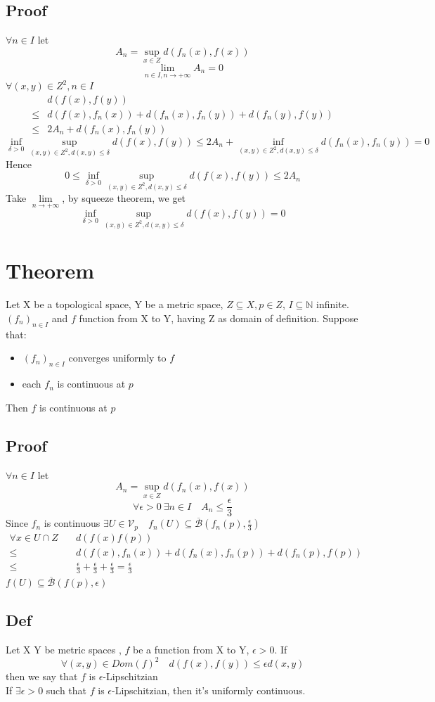 \documentclass{book}
\begin{document}
\subsection{Proof}
$\forall n\in I$ let $$A_n=\sup\limits_{x\in Z}d(f_n(x),f(x))$$
$$ \lim\limits_{n\in I,n\rightarrow+\infty}A_n=0$$
$\forall (x,y)\in Z^2,n\in I$
$$\begin{aligned}
&d(f(x),f(y))\\\leq &d(f(x),f_n(x))+d(f_n(x),f_n(y))+d(f_n(y),f(y))\\\leq &2A_n+d(f_n(x),f_n(y))
\end{aligned}$$
$$\inf\limits_{\delta>0}\sup\limits_{(x,y)\in Z^2,d(x,y)\leq\delta} d(f(x),f(y))\leq 2A_n+\inf\limits_{(x,y)\in Z^2,d(x,y)\leq\delta}d(f_n(x),f_n(y))=0$$ 
Hence $$0\leq \inf\limits_{\delta>0}\sup\limits_{(x,y)\in Z^2,d(x,y)\leq\delta}d(f(x),f(y))\leq 2A_n$$
Take $\lim\limits_{n\rightarrow+\infty}$, by squeeze theorem, we get$$\inf\limits_{\delta>0}\sup\limits_{(x,y)\in Z^2,d(x,y)\leq\delta}d(f(x),f(y))=0$$
\section{Theorem}
Let X be a topological space, Y be a metric space, $Z\subseteq X, p\in Z$, $I\subseteq \mathbb{N} $ infinite. $(f_n)_{n\in I}$ and $f$ function from X to Y, having Z as domain of definition. Suppose that:
\begin{itemize}
    \item $(f_n)_{n\in I}$ converges uniformly to $f$
    \item each $f_n$ is continuous at $p$
\end{itemize}
Then $f$ is continuous at $p$
\subsection{Proof}
$\forall n\in I$ let $$A_n=\sup\limits_{x\in Z}d(f_n(x),f(x))$$
$$\forall \epsilon>0\ \exists n\in I\quad A_n\leq\frac{\epsilon}{3}$$
Since $f_n$ is continuous $\exists U\in \mathcal{V}_p\quad f_n(U)\subseteq \overline{\mathcal{B}}(f_n(p),\frac{\epsilon}{3})$
$$\begin{aligned}
\forall x\in U\cap Z\quad  &d(f(x)f(p))\\\leq &d(f(x),f_n(x))+d(f_n(x),f_n(p))+d(f_n(p),f(p))\\\leq &\frac{\epsilon}{3}+\frac{\epsilon}{3}+\frac{\epsilon}{3}=\frac{\epsilon}{3}
\end{aligned}$$
$f(U)\subseteq\overline{\mathcal{B}}(f(p),\epsilon)$
\subsection{Def}
Let X Y be metric spaces , $f$ be a function from X to Y, $\epsilon>0$. If $$\forall (x,y)\in Dom(f)^2\quad d(f(x),f(y))\leq\epsilon d(x,y)$$
then we say that $f$ is $\epsilon$-Lipschitzian\\
If $\exists \epsilon>0$ such that $f$ is $\epsilon$-Lipschitzian, then it's uniformly continuous.
\end{document}
